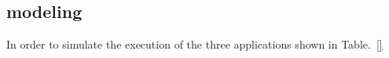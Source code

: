 \subsection{modeling}
\label{sec:modeling}

In order to simulate the execution of the three applications shown in Table.~\ref{}
